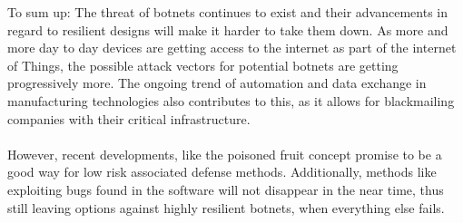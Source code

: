 \documentclass[10pt, a4paper, twocolumn]{article} %
\begin{document}
To sum up: The threat of botnets continues to exist and their advancements in regard to resilient designs will make it harder to take them down. As more and more day to day devices are getting access to the internet as part of the internet of Things, the possible attack vectors for potential botnets are getting progressively more. The ongoing trend of automation and data exchange in manufacturing technologies also contributes to this, as it allows for blackmailing companies with their critical infrastructure. \\\\

However, recent developments, like the poisoned fruit concept promise to be a good way for low risk associated defense methods. Additionally,  methods like exploiting bugs found in the software will not disappear in the near time, thus still leaving options against highly resilient botnets, when everything else fails. 


\printbibliography[title={Bibliography}] %

\listoffigures
\end{document}
